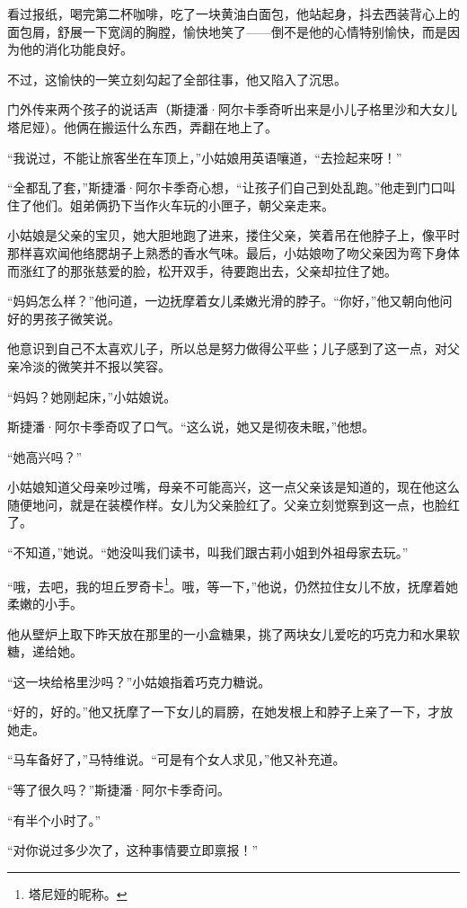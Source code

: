 \par 看过报纸，喝完第二杯咖啡，吃了一块黄油白面包，他站起身，抖去西装背心上的面包屑，舒展一下宽阔的胸膛，愉快地笑了——倒不是他的心情特别愉快，而是因为他的消化功能良好。
\par 不过，这愉快的一笑立刻勾起了全部往事，他又陷入了沉思。
\par 门外传来两个孩子的说话声（斯捷潘·阿尔卡季奇听出来是小儿子格里沙和大女儿塔尼娅）。他俩在搬运什么东西，弄翻在地上了。
\par “我说过，不能让旅客坐在车顶上，”小姑娘用英语嚷道，“去捡起来呀！”
\par “全都乱了套，”斯捷潘·阿尔卡季奇心想，“让孩子们自己到处乱跑。”他走到门口叫住了他们。姐弟俩扔下当作火车玩的小匣子，朝父亲走来。
\par 小姑娘是父亲的宝贝，她大胆地跑了进来，搂住父亲，笑着吊在他脖子上，像平时那样喜欢闻他络腮胡子上熟悉的香水气味。最后，小姑娘吻了吻父亲因为弯下身体而涨红了的那张慈爱的脸，松开双手，待要跑出去，父亲却拉住了她。
\par “妈妈怎么样？”他问道，一边抚摩着女儿柔嫩光滑的脖子。“你好，”他又朝向他问好的男孩子微笑说。
\par 他意识到自己不太喜欢儿子，所以总是努力做得公平些；儿子感到了这一点，对父亲冷淡的微笑并不报以笑容。
\par “妈妈？她刚起床，”小姑娘说。
\par 斯捷潘·阿尔卡季奇叹了口气。“这么说，她又是彻夜未眠，”他想。
\par “她高兴吗？”
\par 小姑娘知道父母亲吵过嘴，母亲不可能高兴，这一点父亲该是知道的，现在他这么随便地问，就是在装模作样。女儿为父亲脸红了。父亲立刻觉察到这一点，也脸红了。
\par “不知道，”她说。“她没叫我们读书，叫我们跟古莉小姐到外祖母家去玩。”
\par “哦，去吧，我的坦丘罗奇卡\footnote{塔尼娅的昵称。}。哦，等一下，”他说，仍然拉住女儿不放，抚摩着她柔嫩的小手。
\par 他从壁炉上取下昨天放在那里的一小盒糖果，挑了两块女儿爱吃的巧克力和水果软糖，递给她。
\par “这一块给格里沙吗？”小姑娘指着巧克力糖说。
\par “好的，好的。”他又抚摩了一下女儿的肩膀，在她发根上和脖子上亲了一下，才放她走。
\par “马车备好了，”马特维说。“可是有个女人求见，”他又补充道。
\par “等了很久吗？”斯捷潘·阿尔卡季奇问。
\par “有半个小时了。”
\par “对你说过多少次了，这种事情要立即禀报！”
